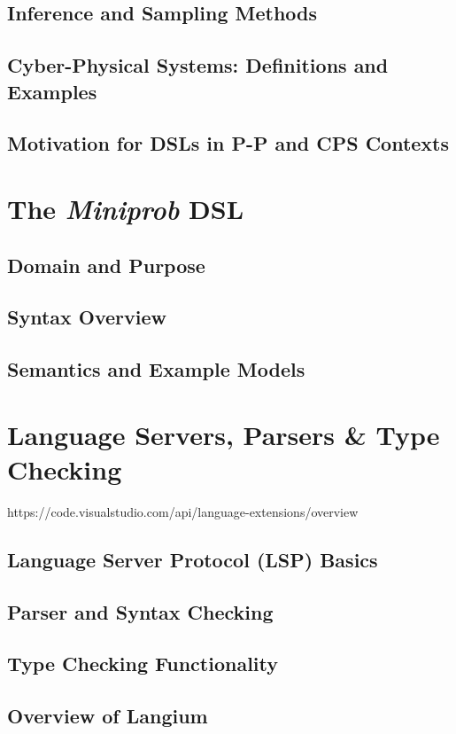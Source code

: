 \documentclass[11pt]{report}
\begin{document}
\section{Inference and Sampling Methods}
\section{Cyber-Physical Systems: Definitions and Examples}
\section{Motivation for DSLs in P-P and CPS Contexts}

\chapter{The \textit{Miniprob} DSL}
\section{Domain and Purpose}
\section{Syntax Overview}
\section{Semantics and Example Models}

\chapter{Language Servers, Parsers \& Type Checking}
https://code.visualstudio.com/api/language-extensions/overview
\section{Language Server Protocol (LSP) Basics}
\section{Parser and Syntax Checking}
\section{Type Checking Functionality}
\section{Overview of Langium}

\end{document}
